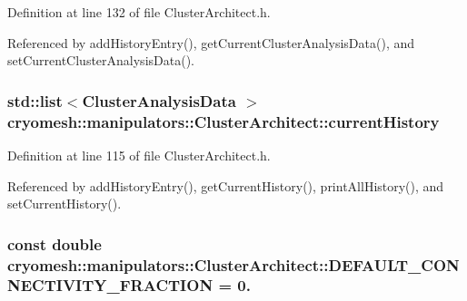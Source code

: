 \-Definition at line 132 of file \-Cluster\-Architect.\-h.



\-Referenced by add\-History\-Entry(), get\-Current\-Cluster\-Analysis\-Data(), and set\-Current\-Cluster\-Analysis\-Data().

\hypertarget{classcryomesh_1_1manipulators_1_1ClusterArchitect_a5ab807b2682f56ffd1cfcf8b7b54b2a0}{
\subsubsection[{current\-History}]{\setlength{\rightskip}{0pt plus 5cm}std\-::list$<${\bf \-Cluster\-Analysis\-Data} $>$ {\bf cryomesh\-::manipulators\-::\-Cluster\-Architect\-::current\-History}}}\label{classcryomesh_1_1manipulators_1_1ClusterArchitect_a5ab807b2682f56ffd1cfcf8b7b54b2a0}


\-Definition at line 115 of file \-Cluster\-Architect.\-h.



\-Referenced by add\-History\-Entry(), get\-Current\-History(), print\-All\-History(), and set\-Current\-History().

\hypertarget{classcryomesh_1_1manipulators_1_1ClusterArchitect_a6ce4a9d1278748853bd451ef7adcfb36}{
\subsubsection[{\-D\-E\-F\-A\-U\-L\-T\-\_\-\-C\-O\-N\-N\-E\-C\-T\-I\-V\-I\-T\-Y\-\_\-\-F\-R\-A\-C\-T\-I\-O\-N}]{\setlength{\rightskip}{0pt plus 5cm}const double {\bf cryomesh\-::manipulators\-::\-Cluster\-Architect\-::\-D\-E\-F\-A\-U\-L\-T\-\_\-\-C\-O\-N\-N\-E\-C\-T\-I\-V\-I\-T\-Y\-\_\-\-F\-R\-A\-C\-T\-I\-O\-N} = 0.}}\label{classcryomesh_1_1manipulators_1_1ClusterArchitect_a6ce4a9d1278748853bd451ef7adcfb36}


